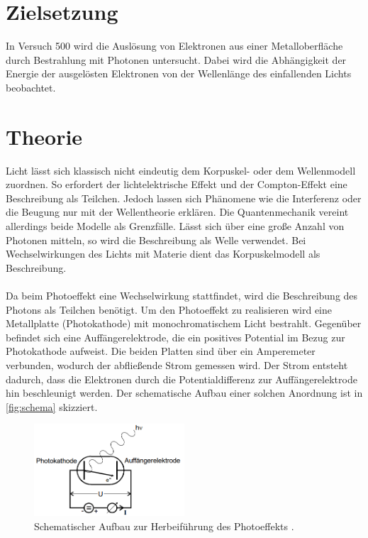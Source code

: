 \section{Zielsetzung}
\label{sec:Zielsetzung}
In Versuch 500 wird die Auslösung von Elektronen aus einer Metalloberfläche durch Bestrahlung mit Photonen untersucht.
Dabei wird die Abhängigkeit der Energie der ausgelösten Elektronen von der Wellenlänge des einfallenden Lichts beobachtet.

\section{Theorie}
\label{sec:Theorie}
Licht lässt sich klassisch nicht eindeutig dem Korpuskel- oder dem Wellenmodell zuordnen. So erfordert der lichtelektrische Effekt und der Compton-Effekt eine
Beschreibung als Teilchen. Jedoch lassen sich Phänomene wie die Interferenz oder die Beugung nur mit der Wellentheorie erklären.
Die Quantenmechanik vereint allerdings beide Modelle als Grenzfälle. Lässt sich über eine große Anzahl von Photonen mitteln, so wird die Beschreibung als Welle verwendet.
Bei Wechselwirkungen des Lichts mit Materie dient das Korpuskelmodell als Beschreibung.
\\
\\
Da beim Photoeffekt eine Wechselwirkung stattfindet, wird die Beschreibung des Photons als Teilchen benötigt. Um den Photoeffekt zu realisieren wird eine Metallplatte (Photokathode)
mit monochromatischem Licht bestrahlt. Gegenüber befindet sich eine Auffängerelektrode, die ein positives Potential im Bezug zur Photokathode aufweist.
Die beiden Platten sind über ein Amperemeter verbunden, wodurch der abfließende Strom gemessen wird. Der Strom entsteht dadurch, dass die Elektronen durch die Potentialdifferenz
zur Auffängerelektrode hin beschleunigt werden. Der schematische Aufbau einer solchen Anordnung ist in \autoref{fig:schema} skizziert.
\begin{figure}[H]
    \centering
    \includegraphics[width=0.5\textwidth]{img/schema.png}
    \caption{Schematischer Aufbau zur Herbeiführung des Photoeffekts \cite{V500}.}
    \label{fig:schema}
\end{figure}

